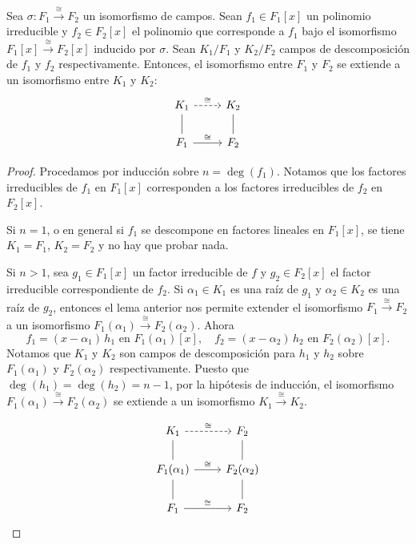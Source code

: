 \begin{lema}
  \label{lema:extesion-de-isomorfismos-a-campo-de-desc}
  Sea $\sigma\colon F_1 \xrightarrow{\cong} F_2$ un isomorfismo de campos. Sean
  $f_1 \in F_1 [x]$ un polinomio irreducible y $f_2 \in F_2 [x]$ el polinomio
  que corresponde a $f_1$ bajo el isomorfismo
  $F_1 [x] \xrightarrow{\cong} F_2 [x]$ inducido por $\sigma$. Sean $K_1/F_1$ y
  $K_2/F_2$ campos de descomposición de $f_1$ y $f_2$ respectivamente. Entonces,
  el isomorfismo entre $F_1$ y $F_2$ se extiende a un isomorfismo entre $K_1$ y
  $K_2$:
  \[ \begin{tikzcd}
    K_1\ar[-]{d} \ar[dashed]{r}{\cong} & K_2\ar[-]{d} \\
    F_1 \ar{r}{\cong} & F_2
  \end{tikzcd} \]

  \begin{proof}
    Procedamos por inducción sobre $n = \deg (f_1)$. Notamos que los factores
    irreducibles de $f_1$ en $F_1 [x]$ corresponden a los factores irreducibles
    de $f_2$ en $F_2 [x]$.

    Si $n = 1$, o en general si $f_1$ se descompone en factores lineales en
    $F_1 [x]$, se tiene $K_1 = F_1$, $K_2 = F_2$ y no hay que probar nada.

    Si $n > 1$, sea $g_1 \in F_1 [x]$ un factor irreducible de $f$ y
    $g_2 \in F_2 [x]$ el factor irreducible correspondiente de $f_2$.
    Si $\alpha_1 \in K_1$ es una raíz de $g_1$ y $\alpha_2 \in K_2$ es una raíz
    de $g_2$, entonces el lema anterior nos permite extender el isomorfismo
    $F_1 \xrightarrow{\cong} F_2$ a un isomorfismo $F_1 (\alpha_1)
    \xrightarrow{\cong} F_2 (\alpha_2)$. Ahora
    \[ f_1 = (x - \alpha_1)\,h_1 \text{ en } F_1(\alpha_1) [x], \quad
    f_2 = (x - \alpha_2)\,h_2 \text{ en } F_2 (\alpha_2)[x]. \]
    Notamos que $K_1$ y $K_2$ son campos de descomposición para $h_1$ y $h_2$
    sobre $F_1 (\alpha_1)$ y $F_2 (\alpha_2)$ respectivamente. Puesto que
    $\deg (h_1) = \deg (h_2) = n-1$, por la hipótesis de inducción,
    el isomorfismo $F_1 (\alpha_1) \xrightarrow{\cong} F_2 (\alpha_2)$
    se extiende a un isomorfismo $K_1 \xrightarrow{\cong} K_2$.

    \[ \begin{tikzcd}
      K_1\ar[-]{d} \ar[dashed]{r}{\cong} & F_2\ar[-]{d} \\
      F_1 (\alpha_1)\ar[-]{d} \ar{r}{\cong} & F_2 (\alpha_2)\ar[-]{d} \\
      F_1 \ar{r}{\cong} & F_2
    \end{tikzcd} \]
  \end{proof}
\end{lema}

